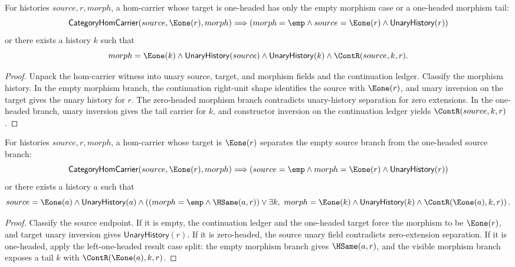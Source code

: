 \begin{theorem}
\label{thm:category-hom-carrier-e1-target-morphism-cases}
For histories $source,r,morph$, a hom-carrier whose target is one-headed has
only the empty morphism case or a one-headed morphism tail:
$$
\mathsf{CategoryHomCarrier}(source,\Eone(r),morph)
\Longrightarrow
\left(
morph=\emp\land source=\Eone(r)\land \mathsf{UnaryHistory}(r)
\right)
$$
or there exists a history $k$ such that
$$
morph=\Eone(k)\land\mathsf{UnaryHistory}(source)\land
\mathsf{UnaryHistory}(k)\land\ContR(source,k,r).
$$
\end{theorem}
\begin{proof}
Unpack the hom-carrier witness into unary source, target, and morphism fields
and the continuation ledger. Classify the morphism history. In the empty
morphism branch, the continuation right-unit shape identifies the source with
$\Eone(r)$, and unary inversion on the target gives the unary history for $r$.
The zero-headed morphism branch contradicts unary-history separation for zero
extensions. In the one-headed branch, unary inversion gives the tail carrier
for $k$, and constructor inversion on the continuation ledger yields
$\ContR(source,k,r)$.
\end{proof}

\begin{theorem}
\label{thm:category-hom-carrier-e1-target-source-morphism-cases}
For histories $source,r,morph$, a hom-carrier whose target is $\Eone(r)$
separates the empty source branch from the one-headed source branch:
$$
\mathsf{CategoryHomCarrier}(source,\Eone(r),morph)
\Longrightarrow
\left(
source=\emp\land morph=\Eone(r)\land \mathsf{UnaryHistory}(r)
\right)
$$
or there exists a history $a$ such that
$$
source=\Eone(a)\land\mathsf{UnaryHistory}(a)\land
\left(
(morph=\emp\land\HSame(a,r))\lor
\exists k,\ morph=\Eone(k)\land\mathsf{UnaryHistory}(k)\land
\ContR(\Eone(a),k,r)
\right).
$$
\end{theorem}
\begin{proof}
Classify the source endpoint. If it is empty, the continuation ledger and the
one-headed target force the morphism to be $\Eone(r)$, and target unary
inversion gives $\mathsf{UnaryHistory}(r)$. If it is zero-headed, the source
unary field contradicts zero-extension separation. If it is one-headed, apply
the left-one-headed result case split: the empty morphism branch gives
$\HSame(a,r)$, and the visible morphism branch exposes a tail $k$ with
$\ContR(\Eone(a),k,r)$.
\end{proof}

